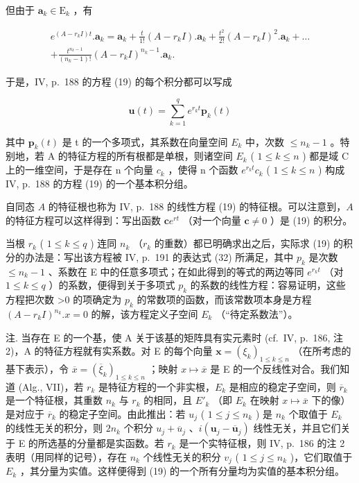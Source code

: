 但由于 \(\mathbf{a}_k\in \mathrm{E}_k\) ，有

\[
\begin{array}{c} e ^ {(A - r _ {k} I) t}. \mathbf {a} _ {k} = \mathbf {a} _ {k} + \frac {t}{1 !} (A - r _ {k} I). \mathbf {a} _ {k} + \frac {t ^ {2}}{2 !} (A - r _ {k} I) ^ {2}. \mathbf {a} _ {k} + \dots \\ + \frac {t ^ {n _ {k} - 1}}{(n _ {k} - 1) !} (A - r _ {k} I) ^ {n _ {k} - 1}. \mathbf {a} _ {k}. \end{array}\tag{31}
\]

于是，IV, p.~188 的方程 (19) 的每个积分都可以写成

\[
\mathbf {u} (t) = \sum_ {k = 1} ^ {q} e ^ {r _ {k} t} \mathbf {p} _ {k} (t)\tag{32}
\]

其中 \(\mathbf{p}_{k}(t)\) 是 t 的一个多项式，其系数在向量空间 \(E_{k}\) 中，次数 \(\leqslant n_{k}-1\) 。特别地，若 A 的特征方程的所有根都是单根，则诸空间 \(E_{k}\) ( \(1 \leqslant k \leqslant n\) ) 都是域 C 上的一维空间，于是存在 n 个向量 \(c_{k}\) ，使得 n 个函数 \(e^{r_{k}t}c_{k}\) ( \(1 \leqslant k \leqslant n\) ) 构成 IV, p.~188 的方程 (19) 的一个基本积分组。

自同态 \(A\) 的特征根也称为 IV, p.~188 的线性方程 (19) 的特征根。可以注意到，\(A\) 的特征方程可以这样得到：写出函数 \(\mathbf{c}e^{rt}\) （对一个向量 \(\mathbf{c} \neq 0\) ）是 (19) 的积分。

当根 \(r_{k}\) ( \(1 \leqslant k \leqslant q\) ) 连同 \(n_{k}\) （\(r_{k}\) 的重数）都已明确求出之后，实际求 (19) 的积分的办法是：写出该方程被 IV, p.~191 的表达式 (32) 所满足，其中 \(p_{k}\) 是次数 \(\leqslant n_{k}-1\) 、系数在 E 中的任意多项式；在如此得到的等式的两边等同 \(e^{r_{k}t}\) （对 \(1 \leqslant k \leqslant q\) ）的系数，便得到关于多项式 \(p_{k}\) 的系数的线性方程：容易证明，这些方程把次数 \textgreater0 的项确定为 \(p_{k}\) 的常数项的函数，而该常数项本身是方程 \((A - r_{k}I)^{n_{k}}.x = 0\) 的解，该方程定义子空间 \(E_{k}\) （“待定系数法”）。

注. 当存在 E 的一个基，使 A 关于该基的矩阵具有实元素时 (cf.~IV, p.~186, 注 2)，A 的特征方程就有实系数。对 E 的每个向量 \(\mathbf{x} = (\xi_k)_{1 \leqslant k \leqslant n}\) （在所考虑的基下表示），令 \(\overline{x} = (\overline{\xi}_k)_{1 \leqslant k \leqslant n}\) ；映射 \(x \mapsto \overline{x}\) 是 E 的一个反线性对合。我们知道 (Alg., VII)，若 \(r_k\) 是特征方程的一个非实根，\(E_k\) 是相应的稳定子空间，则 \(\overline{r}_k\) 是一个特征根，其重数 \(n_k\) 与 \(r_k\) 的相同，且 \(E'_k\) （即 \(E_k\) 在映射 \(x \mapsto \overline{x}\) 下的像）是对应于 \(\overline{r}_k\) 的稳定子空间。由此推出：若 \(u_j\) ( \(1 \leqslant j \leqslant n_k\) ) 是 \(n_k\) 个取值于 \(E_k\) 的线性无关的积分，则 \(2n_k\) 个积分 \(u_j + \overline{u}_j\) 、\(i(\mathbf{u}_j - \overline{\mathbf{u}}_j)\) 线性无关，并且它们关于 E 的所选基的分量都是实函数。若 \(r_k\) 是一个实特征根，则 IV, p.~186 的注 2 表明（用同样的记号），存在 \(n_k\) 个线性无关的积分 \(v_j\) ( \(1 \leqslant j \leqslant n_k\) )，它们取值于 \(E_k\) ，其分量为实值。这样便得到 (19) 的一个所有分量均为实值的基本积分组。

